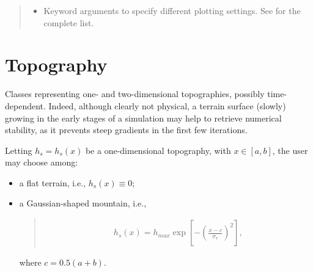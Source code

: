 \documentclass[letterpaper,10pt,english]{sphinxmanual}
\begin{document}
\begin{fulllineitems}
\begin{fulllineitems}
\begin{quote}
\begin{description}
\begin{itemize}
\item {} 
 \textendash{} Keyword arguments to specify different plotting settings.
See {\hyperref[\detokenize{api:utils.utils_plot.quiver_xy}]{}} for the complete list.

\end{itemize}

\end{description}\end{quote}

\end{fulllineitems}


\end{fulllineitems}



\section{Topography}
\label{\detokenize{api:module-grids.topography}}\label{\detokenize{api:topography}}
Classes representing one- and two-dimensional topographies, possibly time-dependent.
Indeed, although clearly not physical, a terrain surface (slowly) growing in the early stages
of a simulation may help to retrieve numerical stability, as it prevents steep gradients
in the first few iterations.

Letting \(h_s = h_s(x)\) be a one-dimensional topography, with \(x \in [a,b]\),
the user may choose among:
\begin{itemize}
\item {} 
a flat terrain, i.e., \(h_s(x) \equiv 0\);

\item {} 
a Gaussian-shaped mountain, i.e.,
\begin{quote}
\begin{equation*}
\begin{split}h_s(x) = h_{max} \exp{\left[ - \left( \frac{x - c}{\sigma_x} \right)^2 \right]},\end{split}
\end{equation*}\end{quote}

where \(c = 0.5 (a + b)\).

\end{itemize}
\end{document}
